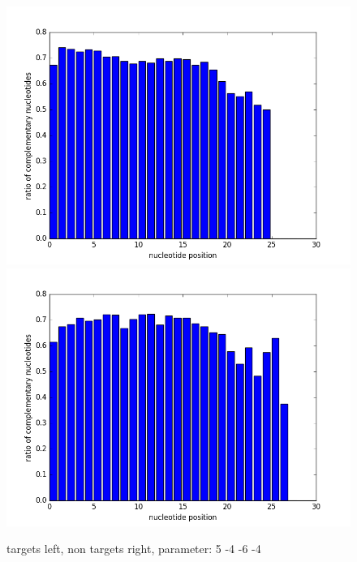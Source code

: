 \documentclass[12pt]{article}
\begin{document}
\begin{figure}
\includegraphics[scale=0.2]{results/ratio5-4-6-4.png}
\includegraphics[scale=0.2]{results/non-ratio5-4-6-4.png}
\caption {targets left, non targets right, parameter: 5 -4 -6 -4}
\label{fig:plot9}
\end{figure}
 
\end{document}
